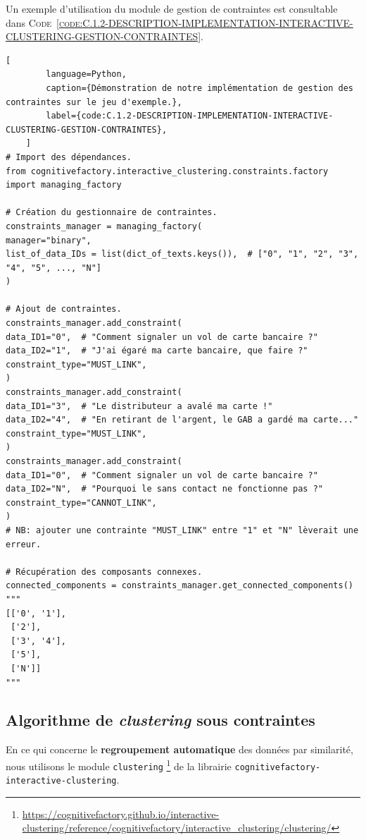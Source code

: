 	Un exemple d'utilisation du module de gestion de contraintes est consultable dans \textsc{Code~\ref{code:C.1.2-DESCRIPTION-IMPLEMENTATION-INTERACTIVE-CLUSTERING-GESTION-CONTRAINTES}}.
	
	\begin{lstlisting}[
		language=Python,
		caption={Démonstration de notre implémentation de gestion des contraintes sur le jeu d'exemple.},
		label={code:C.1.2-DESCRIPTION-IMPLEMENTATION-INTERACTIVE-CLUSTERING-GESTION-CONTRAINTES},
	]
# Import des dépendances.
from cognitivefactory.interactive_clustering.constraints.factory import managing_factory

# Création du gestionnaire de contraintes.
constraints_manager = managing_factory(
manager="binary",
list_of_data_IDs = list(dict_of_texts.keys()),  # ["0", "1", "2", "3", "4", "5", ..., "N"]
)

# Ajout de contraintes.
constraints_manager.add_constraint(
data_ID1="0",  # "Comment signaler un vol de carte bancaire ?"
data_ID2="1",  # "J'ai égaré ma carte bancaire, que faire ?"
constraint_type="MUST_LINK",
)
constraints_manager.add_constraint(
data_ID1="3",  # "Le distributeur a avalé ma carte !"
data_ID2="4",  # "En retirant de l'argent, le GAB a gardé ma carte..."
constraint_type="MUST_LINK",
)
constraints_manager.add_constraint(
data_ID1="0",  # "Comment signaler un vol de carte bancaire ?"
data_ID2="N",  # "Pourquoi le sans contact ne fonctionne pas ?"
constraint_type="CANNOT_LINK",
)
# NB: ajouter une contrainte "MUST_LINK" entre "1" et "N" lèverait une erreur.

# Récupération des composants connexes.
connected_components = constraints_manager.get_connected_components()
"""
[['0', '1'],
 ['2'],
 ['3', '4'],
 ['5'],
 ['N']]
"""
	\end{lstlisting}
	
	
	\subsection{Algorithme de \textit{clustering} sous contraintes}
	\label{annex:C.1.3-DESCRIPTION-IMPLEMENTATION-INTERACTIVE-CLUSTERING-ALGORITHMES-CLUSTERING-SOUS-CONTRAINTES}
	
	En ce qui concerne le \textbf{regroupement automatique} des données par similarité, nous utilisons le module \texttt{clustering} \footnote{
		\url{https://cognitivefactory.github.io/interactive-clustering/reference/cognitivefactory/interactive_clustering/clustering/}
	} de la librairie \texttt{cognitivefactory-interactive-clustering}.
	
